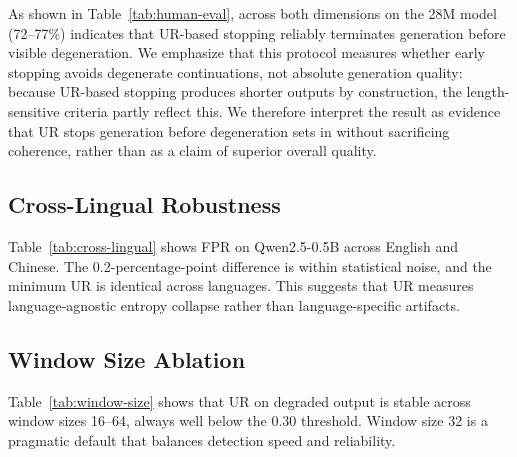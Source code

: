 \documentclass[11pt]{article}
\begin{document}
As shown in Table~\ref{tab:human-eval}, across both dimensions on the 28M model (72--77\%) indicates that UR-based stopping reliably terminates generation before visible degeneration. We emphasize that this protocol measures whether early stopping avoids degenerate continuations, not absolute generation quality: because UR-based stopping produces shorter outputs by construction, the length-sensitive criteria partly reflect this. We therefore interpret the result as evidence that UR stops generation before degeneration sets in without sacrificing coherence, rather than as a claim of superior overall quality.

\subsection{Cross-Lingual Robustness}

Table~\ref{tab:cross-lingual} shows FPR on Qwen2.5-0.5B across English and Chinese. The 0.2-percentage-point difference is within statistical noise, and the minimum UR is identical across languages. This suggests that UR measures language-agnostic entropy collapse rather than language-specific artifacts.

\begin{table}[t]
\centering
\caption{Cross-lingual FPR on Qwen2.5-0.5B. Differences are within statistical noise.}
\label{tab:cross-lingual}
\end{table}

\subsection{Window Size Ablation}

Table~\ref{tab:window-size} shows that UR on degraded output is stable across window sizes 16--64, always well below the 0.30 threshold. Window size 32 is a pragmatic default that balances detection speed and reliability.

\begin{table}[t]
\centering
\caption{Window size ablation on GPT-2 124M ($N$=20). UR is stable across window sizes.}
\label{tab:window-size}
\end{table}
\end{document}
